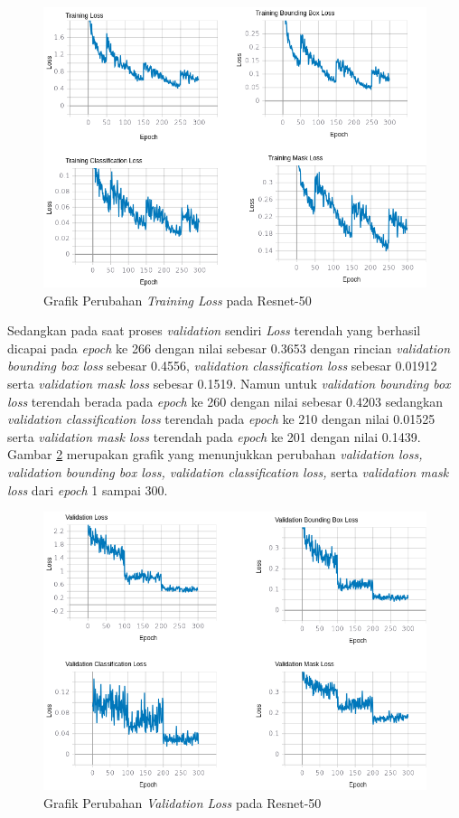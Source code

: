 \begin{figure}[h]
	\centering
	\includegraphics[scale=0.36]{gambar/resnet50-training.png}
	\caption{Grafik Perubahan \textit{Training Loss} pada Resnet-50}
	\label{fig:resnet50-training}
\end{figure}

Sedangkan pada saat proses \textit{validation} sendiri \textit{Loss} terendah yang berhasil dicapai pada \textit{epoch} ke 266 dengan nilai sebesar 0.3653 dengan rincian \textit{validation bounding box loss} sebesar 0.4556, \textit{validation classification loss} sebesar 0.01912 serta \textit{validation mask loss} sebesar 0.1519. Namun untuk \textit{validation bounding box loss} terendah berada pada \textit{epoch} ke 260 dengan nilai sebesar 0.4203 sedangkan \textit{validation classification loss} terendah pada \textit{epoch} ke 210 dengan nilai 0.01525 serta \textit{validation mask loss} terendah pada \textit{epoch} ke 201 dengan nilai 0.1439. Gambar \ref{fig:resnet50-val} merupakan grafik yang menunjukkan perubahan \textit{validation loss, validation bounding box loss, validation classification loss,} serta \textit{validation mask loss} dari \textit{epoch} 1 sampai 300.

\begin{figure}[h]
	\centering
	\includegraphics[scale=0.36]{gambar/resnet50-val.png}
	\caption{Grafik Perubahan \textit{Validation Loss} pada Resnet-50}
	\label{fig:resnet50-val}
\end{figure}

